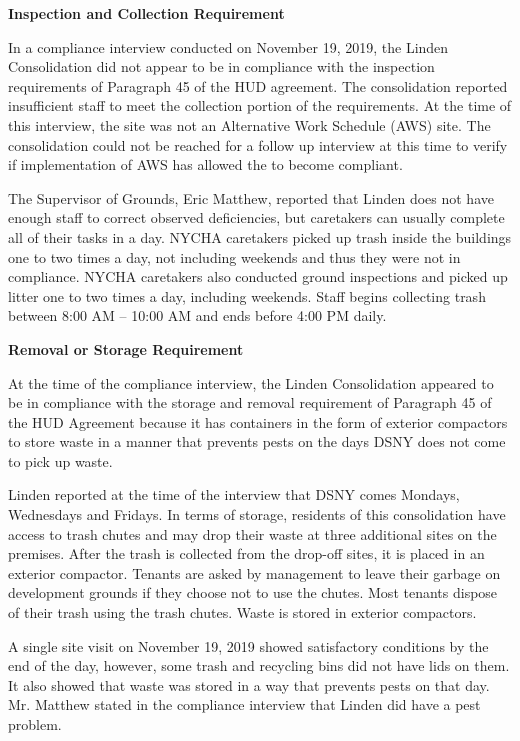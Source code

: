 

\textbf{Inspection and Collection Requirement}

In a compliance interview conducted on November 19, 2019, the Linden Consolidation did not appear to be in compliance with the inspection requirements of Paragraph 45 of the HUD agreement. The consolidation reported insufficient staff to meet the collection portion of the requirements. At the time of this interview, the site was not an Alternative Work Schedule (AWS) site. The consolidation could not be reached for a follow up interview at this time to verify if implementation of AWS has allowed the to become compliant. 

The Supervisor of Grounds, Eric Matthew, reported that Linden does not have enough staff to correct observed deficiencies, but caretakers can usually complete all of their tasks in a day. NYCHA caretakers picked up trash inside the buildings one to two times a day, not including weekends and thus they were not in compliance. NYCHA caretakers also conducted ground inspections and picked up litter one to two times a day, including weekends. Staff begins collecting trash between 8:00 AM -- 10:00 AM and ends before 4:00 PM daily.

\textbf{Removal or Storage Requirement}

At the time of the compliance interview, the Linden Consolidation appeared to be in compliance with the storage and removal requirement of Paragraph 45 of the HUD Agreement because it has containers in the form of exterior compactors to store waste in a manner that prevents pests on the days DSNY does not come to pick up waste. 

Linden reported at the time of the interview that DSNY comes Mondays, Wednesdays and Fridays. In terms of storage, residents of this consolidation have access to trash chutes and may drop their waste at three additional sites on the premises. After the trash is collected from the drop-off sites, it is placed in an exterior compactor. Tenants are asked by management to leave their garbage on development grounds if they choose not to use the chutes. Most tenants dispose of their trash using the trash chutes. Waste is stored in exterior compactors.

A single site visit on November 19, 2019 showed satisfactory conditions by the end of the day, however, some trash and recycling bins did not have lids on them. It also showed that waste was stored in a way that prevents pests on that day. Mr. Matthew stated in the compliance interview that Linden did have a pest problem.

